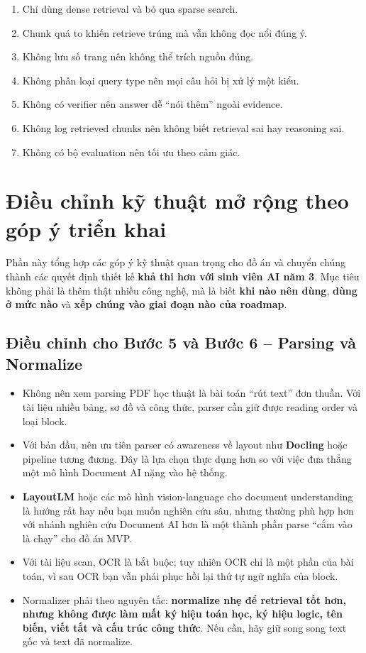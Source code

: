 \documentclass[12pt,a4paper]{article}
\begin{document}
\begin{warningbox}
\begin{enumerate}[label=\arabic*.]
    \item Chỉ dùng dense retrieval và bỏ qua sparse search.
    \item Chunk quá to khiến retrieve trúng mà vẫn không đọc nổi đúng ý.
    \item Không lưu số trang nên không thể trích nguồn đúng.
    \item Không phân loại query type nên mọi câu hỏi bị xử lý một kiểu.
    \item Không có verifier nên answer dễ ``nói thêm'' ngoài evidence.
    \item Không log retrieved chunks nên không biết retrieval sai hay reasoning sai.
    \item Không có bộ evaluation nên tối ưu theo cảm giác.
\end{enumerate}
\end{warningbox}


\section{Điều chỉnh kỹ thuật mở rộng theo góp ý triển khai}

Phần này tổng hợp các góp ý kỹ thuật quan trọng cho đồ án và chuyển chúng thành các quyết định thiết kế \textbf{khả thi hơn với sinh viên AI năm 3}. Mục tiêu không phải là thêm thật nhiều công nghệ, mà là biết \textbf{khi nào nên dùng}, \textbf{dùng ở mức nào} và \textbf{xếp chúng vào giai đoạn nào của roadmap}.

\subsection{Điều chỉnh cho Bước 5 và Bước 6 -- Parsing và Normalize}

\begin{itemize}
    \item Không nên xem parsing PDF học thuật là bài toán ``rút text'' đơn thuần. Với tài liệu nhiều bảng, sơ đồ và công thức, parser cần giữ được reading order và loại block.
    \item Với bản đầu, nên ưu tiên parser có awareness về layout như \textbf{Docling} hoặc pipeline tương đương. Đây là lựa chọn thực dụng hơn so với việc đưa thẳng một mô hình Document AI nặng vào hệ thống.
    \item \textbf{LayoutLM} hoặc các mô hình vision-language cho document understanding là hướng rất hay nếu bạn muốn nghiên cứu sâu, nhưng thường phù hợp hơn với nhánh nghiên cứu Document AI hơn là một thành phần parse ``cắm vào là chạy'' cho đồ án MVP.
    \item Với tài liệu scan, OCR là bắt buộc; tuy nhiên OCR chỉ là một phần của bài toán, vì sau OCR bạn vẫn phải phục hồi lại thứ tự ngữ nghĩa của block.
    \item Normalizer phải theo nguyên tắc: \textbf{normalize nhẹ để retrieval tốt hơn, nhưng không được làm mất ký hiệu toán học, ký hiệu logic, tên biến, viết tắt và cấu trúc công thức}. Nếu cần, hãy giữ song song text gốc và text đã normalize.
\end{itemize}
\end{document}
